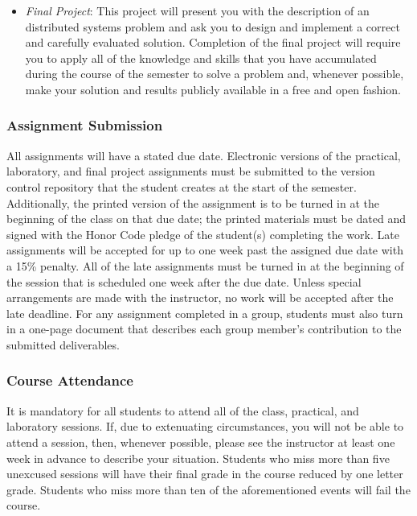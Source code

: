 \begin{itemize}
    \item {\em Final Project}: This project will present you with the description of an distributed systems problem and
      ask you to design and implement a correct and carefully evaluated solution. Completion of the final project will
      require you to apply all of the knowledge and skills that you have accumulated during the course of the semester
      to solve a problem and, whenever possible, make your solution and results publicly available in a free and open
      fashion.

\end{itemize}

\subsubsection*{Assignment Submission}

All assignments will have a stated due date. Electronic versions of the practical, laboratory, and final project
assignments must be submitted to the version control repository that the student creates at the start of the semester.
Additionally, the printed version of the assignment is to be turned in at the beginning of the class on that due date;
the printed materials must be dated and signed with the Honor Code pledge of the student(s) completing the work.  Late
assignments will be accepted for up to one week past the assigned due date with a 15\% penalty. All of the late
assignments must be turned in at the beginning of the session that is scheduled one week after the due date. Unless
special arrangements are made with the instructor, no work will be accepted after the late deadline. For any
assignment completed in a group, students must also turn in a one-page document that describes each group member's
contribution to the submitted deliverables.

\subsubsection*{Course Attendance}

It is mandatory for all students to attend all of the class, practical, and laboratory sessions. If, due to extenuating
circumstances, you will not be able to attend a session, then, whenever possible, please see the instructor at least one
week in advance to describe your situation.  Students who miss more than five unexcused sessions will have their final
grade in the course reduced by one letter grade. Students who miss more than ten of the aforementioned events will fail
the course.

